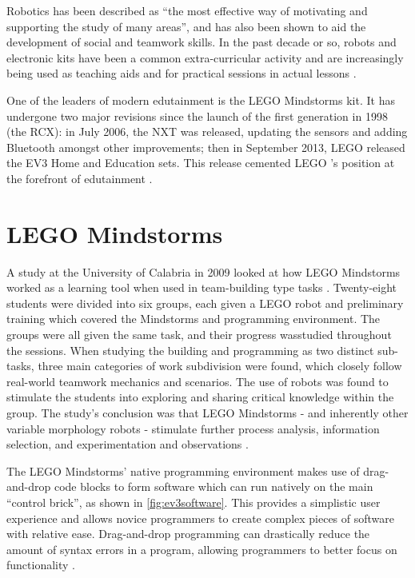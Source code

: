 \documentclass{report}
\newcommand{\lego}{LEGO }
\begin{document}
    Robotics has been described as \enquote{the most effective way of motivating and supporting the study of many areas}, and has also been shown to aid the development of social and teamwork skills. In the past decade or so, robots and electronic kits have been a common extra-curricular activity and are increasingly being used as teaching aids and for practical sessions in actual lessons \cite{Johnson2003}.
    
	One of the leaders of modern edutainment is the \lego Mindstorms kit. It has undergone two major revisions since the launch of the first generation in 1998 (the RCX): in July 2006, the NXT was released, updating the sensors and adding Bluetooth amongst other improvements; then in September 2013, \lego released the EV3 Home and Education sets. This release cemented \lego's position at the forefront of edutainment \cite{Becker}.
    
    \section{\lego Mindstorms}
    A study at the University of Calabria in 2009 looked at how \lego Mindstorms worked as a learning tool when used in team-building type tasks \cite{Bilotta2009}. Twenty-eight students were divided into six groups, each given a \lego robot and preliminary training which covered the Mindstorms and programming environment. The groups were all given the same task, and their progress wasstudied throughout the sessions. When studying the building and programming as two distinct sub-tasks, three main categories of work subdivision were found, which closely follow real-world teamwork mechanics and scenarios. The use of robots was found to stimulate the students into exploring and sharing critical knowledge within the group. The study's conclusion was that \lego Mindstorms - and inherently other variable morphology robots - stimulate further process analysis, information selection, and experimentation and observations \cite{Bilotta2009}.
    
    The \lego Mindstorms' native programming environment makes use of drag-and-drop code blocks to form software which can run natively on the main \enquote{control brick}, as shown in \ref{fig:ev3software}. This provides a simplistic user experience and allows novice programmers to create complex pieces of software with relative ease. Drag-and-drop programming can drastically reduce the amount of syntax errors in a program, allowing programmers to better focus on functionality \cite{Kelleher2002}.
\end{document}
